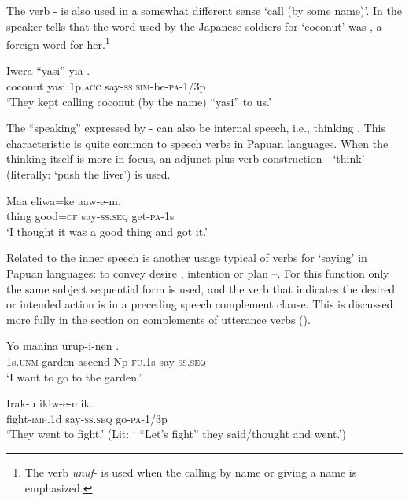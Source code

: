 The verb - is also used in a somewhat different sense `call (by some name)'. In  the speaker tells that the word used by the Japanese soldiers for `coconut' was , a foreign word for her.\footnote{The verb \textit{unuf}- is used when the calling by name or giving a name is emphasized.}

\ea%
\label{ex:3:x326}
\gll Iwera ``yasi'' yia . \\
coconut yasi 1p.\textsc{acc} say-\textsc{ss}.\textsc{sim}-be-\textsc{pa}-1/3p\\
\glt`They kept calling coconut (by the name) ``yasi'' to us.' 
\z

The ``speaking'' expressed by - can also be internal speech, i.e., thinking . This characteristic is quite common to speech verbs in Papuan languages. When the thinking  itself is more in focus, an adjunct plus verb construction  - `think' (literally: `push the liver') is used.

\ea%
\label{ex:3:x327}
\gll Maa eliwa=ke  aaw-e-m. \\
thing good=\textsc{cf} say-\textsc{ss}.\textsc{seq} get-\textsc{pa}-1s \\
\glt`I thought it was a good thing and got it.'
\z

Related to the inner speech is another usage typical of verbs for `saying' in Papuan languages: to convey desire , intention or plan --. For this function only the same subject sequential form\textit{}  is used, and the verb that indicates the desired or intended action is in a preceding speech complement clause. This is discussed more fully in the section on complements of utterance verbs (). 

\ea%
\label{ex:3:x328}
\gll {\ob}Yo manina urup-i-nen{\cb} . \\
1s.\textsc{unm} garden ascend-Np-\textsc{fu}.1s say-\textsc{ss}.\textsc{seq} \\
\glt`I want to go to the garden.'
\z

\ea%
\label{ex:3:x329}
\gll {\ob}Irak-u{\cb}  ikiw-e-mik. \\
fight-\textsc{imp}.1d say-\textsc{ss}.\textsc{seq} go-\textsc{pa}-1/3p\\
\glt`They went to fight.' (Lit: ` ``Let's fight'' they said/thought and went.')
\z

